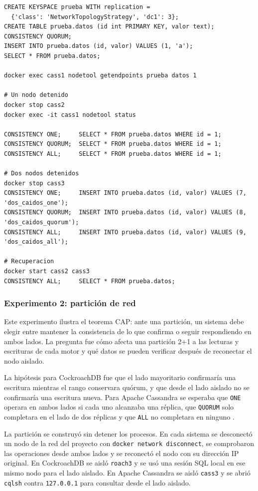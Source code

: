 \documentclass[11pt,a4paper]{article}
\newcommand{\sistemaA}{CockroachDB}      %
\newcommand{\sistemaB}{Apache Cassandra} %
\begin{document}
\begin{lstlisting}[caption={Comandos del experimento 1 en \sistemaB{} (extracto).},label={lst:e1-cass}]
CREATE KEYSPACE prueba WITH replication =
  {'class': 'NetworkTopologyStrategy', 'dc1': 3};
CREATE TABLE prueba.datos (id int PRIMARY KEY, valor text);
CONSISTENCY QUORUM;
INSERT INTO prueba.datos (id, valor) VALUES (1, 'a');
SELECT * FROM prueba.datos;

docker exec cass1 nodetool getendpoints prueba datos 1

# Un nodo detenido
docker stop cass2
docker exec -it cass1 nodetool status

CONSISTENCY ONE;     SELECT * FROM prueba.datos WHERE id = 1;
CONSISTENCY QUORUM;  SELECT * FROM prueba.datos WHERE id = 1;
CONSISTENCY ALL;     SELECT * FROM prueba.datos WHERE id = 1;

# Dos nodos detenidos
docker stop cass3
CONSISTENCY ONE;     INSERT INTO prueba.datos (id, valor) VALUES (7, 'dos_caidos_one');
CONSISTENCY QUORUM;  INSERT INTO prueba.datos (id, valor) VALUES (8, 'dos_caidos_quorum');
CONSISTENCY ALL;     INSERT INTO prueba.datos (id, valor) VALUES (9, 'dos_caidos_all');

# Recuperacion
docker start cass2 cass3
CONSISTENCY ALL;     SELECT * FROM prueba.datos;
\end{lstlisting}

\subsubsection{Experimento 2: partición de red}

Este experimento ilustra el teorema CAP: ante una partición, un sistema debe
elegir entre mantener la consistencia de lo que confirma o seguir respondiendo en
ambos lados. La pregunta fue cómo afecta una partición 2+1 a las lecturas y
escrituras de cada motor y qué datos se pueden verificar después de reconectar el
nodo aislado.

La hipótesis para \sistemaA{} fue que el lado mayoritario confirmaría una escritura
mientras el rango conservara quórum, y que desde el lado aislado no se confirmaría
una escritura nueva. Para \sistemaB{} se esperaba que \texttt{ONE} operara en ambos
lados si cada uno alcanzaba una réplica, que \texttt{QUORUM} solo completara en el
lado de dos réplicas y que \texttt{ALL} no completara en ninguno
\cite{apacheCassandraDynamo}.

La partición se construyó sin detener los procesos. En cada sistema se desconectó
un nodo de la red del proyecto con \texttt{docker network disconnect}, se
comprobaron las operaciones desde ambos lados y se reconectó el nodo con su
dirección IP original. En \sistemaA{} se aisló \texttt{roach3} y se usó una sesión
SQL local en ese mismo nodo para el lado aislado. En \sistemaB{} se aisló
\texttt{cass3} y se abrió \texttt{cqlsh} contra \texttt{127.0.0.1} para consultar
desde el lado aislado.
\end{document}
